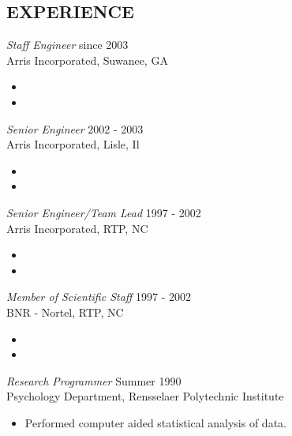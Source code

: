 \documentclass[line,margin]{res}
\begin{document}
\address{2910 Saddlebrook Glen Dr.}
\address{Cumming, GA 30041}

 
\begin{resume}
\section{EXPERIENCE} {\sl Staff Engineer} \hfill since 2003 \\
                Arris Incorporated, Suwanee, GA
                 \begin{itemize}  \itemsep -2pt %
                 \item 
                 \item
                 \end{itemize}

                {\sl Senior Engineer} \hfill 2002 - 2003 \\
                Arris Incorporated, Lisle, Il
                 \begin{itemize}  \itemsep -2pt %
                 \item 
                 \item
                 \end{itemize}
                
                {\sl Senior Engineer/Team Lead} \hfill 1997 - 2002 \\
                Arris Incorporated, RTP, NC
                 \begin{itemize}  \itemsep -2pt %
                 \item 
                 \item
                 \end{itemize}
                
                {\sl Member of Scientific Staff} \hfill 1997 - 2002 \\
                BNR - Nortel, RTP, NC
                 \begin{itemize}  \itemsep -2pt %
                 \item 
                 \item
                 \end{itemize}
 
 
                {\sl Research Programmer} \hfill            Summer 1990 \\
                Psychology Department, Rensselaer Polytechnic 
                Institute 
                 \begin{itemize}  \itemsep -2pt %
                 \item Performed computer aided statistical analysis 
                    of data. 
                 \end{itemize} 


\end{resume}
\end{document}
